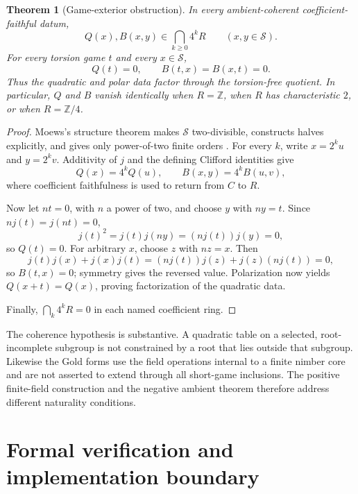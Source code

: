 \documentclass[11pt]{article}
\newtheorem{theorem}{Theorem}[section]
\theoremstyle{definition}
\theoremstyle{remark}
\begin{document}
\begin{theorem}[Game-exterior obstruction]\label{thm:exterior}
In every ambient-coherent coefficient-faithful datum,
\[
 Q(x),B(x,y)\in\bigcap_{k\ge0}4^kR
 \qquad(x,y\in\mathcal S).
\]
For every torsion game $t$ and every $x\in\mathcal S$,
\[
  Q(t)=0,\qquad B(t,x)=B(x,t)=0.
\]
Thus the quadratic and polar data factor through the torsion-free quotient.
In particular, $Q$ and $B$ vanish identically when $R=\mathbb Z$, when
$R$ has characteristic $2$, or when $R=\mathbb Z/4$.
\end{theorem}

\begin{proof}
Moews's structure theorem makes $\mathcal S$ two-divisible, constructs
halves explicitly, and gives only power-of-two finite orders
\cite[Theorems~8--9]{moews2002}.  For every $k$, write
$x=2^ku$ and $y=2^kv$.  Additivity of $j$ and the defining Clifford identities
give
\[
 Q(x)=4^kQ(u),\qquad B(x,y)=4^kB(u,v),
\]
where coefficient faithfulness is used to return from $C$ to $R$.

Now let $nt=0$, with $n$ a power of two, and choose $y$ with $ny=t$.  Since
$nj(t)=j(nt)=0$,
\[
 j(t)^2=j(t)j(ny)=(nj(t))j(y)=0,
\]
so $Q(t)=0$.  For arbitrary $x$, choose $z$ with $nz=x$.  Then
\[
 j(t)j(x)+j(x)j(t)
 =(nj(t))j(z)+j(z)(nj(t))=0,
\]
so $B(t,x)=0$; symmetry gives the reversed value.  Polarization now yields
$Q(x+t)=Q(x)$, proving factorization of the quadratic data.

Finally, $\bigcap_k4^kR=0$ in each named coefficient ring.
\end{proof}

The coherence hypothesis is substantive.  A quadratic table on a selected,
root-incomplete subgroup is not constrained by a root that lies outside that
subgroup.  Likewise the Gold forms use the field operations internal to a
finite nimber core and are not asserted to extend through all short-game
inclusions.  The positive finite-field construction and the negative ambient
theorem therefore address different naturality conditions.

\section{Formal verification and implementation boundary}\label{sec:formal}
\end{document}
